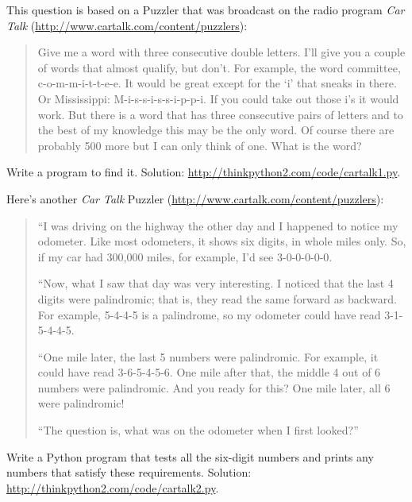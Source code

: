 \documentclass[10pt]{book}
\begin{document}
\begin{exercise}

This question is based on a Puzzler that was broadcast on the radio
program {\em Car Talk} 
(\url{http://www.cartalk.com/content/puzzlers}):

\begin{quote}
Give me a word with three consecutive double letters. I'll give you a
couple of words that almost qualify, but don't. For example, the word
committee, c-o-m-m-i-t-t-e-e. It would be great except for the `i' that
sneaks in there. Or Mississippi: M-i-s-s-i-s-s-i-p-p-i. If you could
take out those i's it would work. But there is a word that has three
consecutive pairs of letters and to the best of my knowledge this may
be the only word. Of course there are probably 500 more but I can only
think of one. What is the word?
\end{quote}

Write a program to find it.
Solution: \url{http://thinkpython2.com/code/cartalk1.py}.

\end{exercise}


\begin{exercise}
Here's another {\em Car Talk}
Puzzler (\url{http://www.cartalk.com/content/puzzlers}):

\begin{quote}
``I was driving on the highway the other day and I happened to
notice my odometer. Like most odometers, it shows six digits,
in whole miles only. So, if my car had 300,000
miles, for example, I'd see 3-0-0-0-0-0.

``Now, what I saw that day was very interesting. I noticed that the
last 4 digits were palindromic; that is, they read the same forward as
backward. For example, 5-4-4-5 is a palindrome, so my odometer
could have read 3-1-5-4-4-5.

``One mile later, the last 5 numbers were palindromic. For example, it
could have read 3-6-5-4-5-6.  One mile after that, the middle 4 out of
6 numbers were palindromic.  And you ready for this? One mile later,
all 6 were palindromic!

``The question is, what was on the odometer when I first looked?''
\end{quote}

Write a Python program that tests all the six-digit numbers and prints
any numbers that satisfy these requirements.  
Solution: \url{http://thinkpython2.com/code/cartalk2.py}.

\end{exercise}
\end{document}
